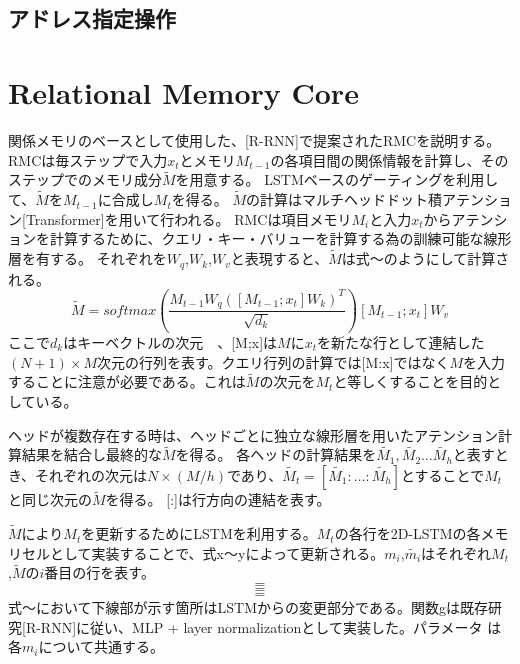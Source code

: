 \subsection{アドレス指定操作}

\section{Relational Memory Core}
関係メモリのベースとして使用した、[R-RNN]で提案されたRMCを説明する。
RMCは毎ステップで入力$x_t$とメモリ$M_{t-1}$の各項目間の関係情報を計算し、そのステップでのメモリ成分$\tilde{M}$を用意する。
LSTMベースのゲーティングを利用して、$\tilde{M}$を$M_{t-1}$に合成し$M_t$を得る。
$\tilde{M}$の計算はマルチヘッドドット積アテンション[Transformer]を用いて行われる。
RMCは項目メモリ$M_i$と入力$x_t$からアテンションを計算するために、クエリ・キー・バリューを計算する為の訓練可能な線形層を有する。
それぞれを$W_q$,$W_k$,$W_v$と表現すると、$\tilde{M}$は式～のようにして計算される。
\begin{equation}
	\tilde{M} =softmax ( \frac{M_{t-1}W_q ([M_{t-1};x_t]W_k)^T}{ \sqrt{d_k}} ) [M_{t-1};x_t]W_v
\end{equation}
ここで$d_k$はキーベクトルの次元　、[M;x]は$M$に$x_t$を新たな行として連結した$(N+1)\times M$次元の行列を表す。クエリ行列の計算では[M:x]ではなく$M$を入力することに注意が必要である。これは$\tilde{M}$の次元を$M_t$と等しくすることを目的としている。

ヘッドが複数存在する時は、ヘッドごとに独立な線形層を用いたアテンション計算結果を結合し最終的な$\tilde{M}$を得る。
各ヘッドの計算結果を$\tilde{M_1},\tilde{M_2}…\tilde{M_h}$と表すとき、それぞれの次元は$N\times (M/h)$であり、$\tilde{M_t}=[\tilde{M_1}: … :\tilde{M_h}]$とすることで$M_t$と同じ次元の$\tilde{M}$を得る。
[:]は行方向の連結を表す。

$\tilde{M}$により$M_t$を更新するためにLSTMを利用する。$M_t$の各行を2D-LSTMの各メモリセルとして実装することで、式x～yによって更新される。$m_i$,$\tilde{m_i}$はそれぞれ$M_t$,$\tilde{M}$の$i$番目の行を表す。
\begin{equation}
	 =
\end{equation}
\begin{equation}
	=
\end{equation}
\begin{equation}
	=
\end{equation}
式～において下線部が示す箇所はLSTMからの変更部分である。関数gは既存研究[R-RNN]に従い、MLP + layer normalizationとして実装した。パラメータ は各$m_i$について共通する。
